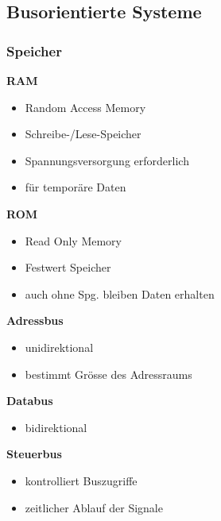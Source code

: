 \subsection{Busorientierte Systeme}
\subsubsection{Speicher}
\begin{multicols}{2}
    \textbf{RAM}
    \begin{itemize}
        \item Random Access Memory
        \item Schreibe-/Lese-Speicher
        \item Spannungsversorgung erforderlich
        \item für temporäre Daten
    \end{itemize}

    \textbf{ROM}
    \begin{itemize}
        \item Read Only Memory
        \item Festwert Speicher
        \item auch ohne Spg. bleiben Daten erhalten
    \end{itemize}
\end{multicols}

\begin{multicols}{3}
    \begin{minipage}{4cm}
        \textbf{Adressbus}
        \begin{itemize}
            \item unidirektional
            \item bestimmt Grösse des Adressraums
        \end{itemize}
    \end{minipage}
    
    \begin{minipage}{4cm}
        \textbf{Databus}
        \begin{itemize}
            \item bidirektional
        \end{itemize}
    \end{minipage}
    
    \begin{minipage}{5cm}
        \textbf{Steuerbus}
        \begin{itemize}
            \item kontrolliert Buszugriffe
            \item zeitlicher Ablauf der Signale
        \end{itemize}
    \end{minipage}
\end{multicols}

